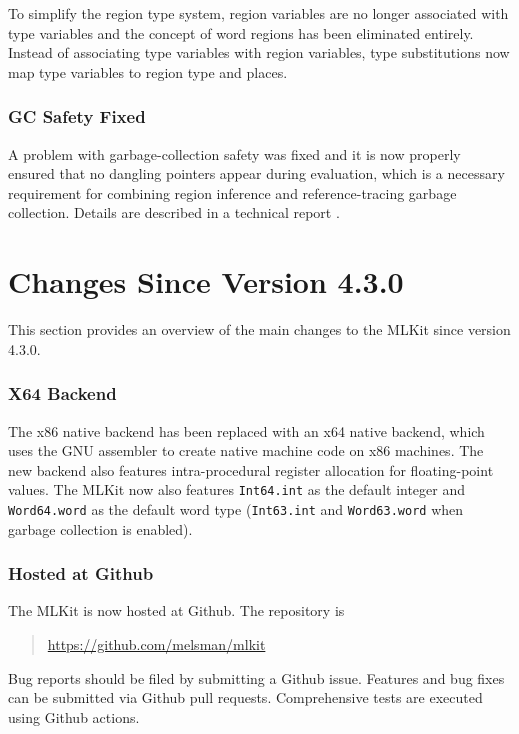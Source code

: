 \documentclass[12pt]{book}
\begin{document}
To simplify the region type system, region variables are no longer
associated with type variables and the concept of word regions has
been eliminated entirely. Instead of associating type variables with
region variables, type substitutions now map type variables to region
type and places.

\subsubsection*{GC Safety Fixed}

A problem with garbage-collection safety was fixed and it is now
properly ensured that no dangling pointers appear during evaluation,
which is a necessary requirement for combining region inference and
reference-tracing garbage collection. Details are described in a
technical report \cite{gcsafety-revisited-tr-2022}.

\section{Changes Since Version 4.3.0}
%
This section provides an overview of the main changes to the MLKit
since version 4.3.0.

\subsubsection*{X64 Backend}
The
%
%
%
x86 native backend has been replaced with an
%
%
%
x64 native backend, which uses the GNU assembler to create native
machine code on x86 machines. The new backend also features
intra-procedural register allocation for floating-point values. The
MLKit now also features \texttt{Int64.int} as the default integer and
\texttt{Word64.word} as the default word type (\texttt{Int63.int} and
\texttt{Word63.word} when garbage collection is enabled).

\subsubsection*{Hosted at Github}
%
%
%
%
The MLKit is now hosted at Github. The repository is
\begin{quote}
  \url{https://github.com/melsman/mlkit}
\end{quote}
%
%
%
%
Bug reports should be filed by submitting a Github issue. Features and
bug fixes can be submitted via Github pull requests. Comprehensive
tests are executed  using Github actions.
\end{document}

